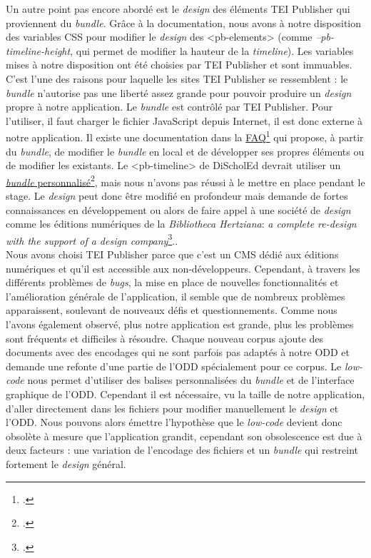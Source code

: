 Un autre point pas encore abordé est le \textit{design} des éléments TEI Publisher qui proviennent du \textit{bundle}. Grâce à la documentation, nous avons à notre disposition des variables CSS pour modifier le \textit{design} des <pb-elements> (comme \textit{--pb-timeline-height}, qui permet de modifier la hauteur de la \textit{timeline}). Les variables mises à notre disposition ont été choisies par TEI Publisher et sont immuables. C'est l'une des raisons pour laquelle les sites TEI Publisher se ressemblent : le \textit{bundle} n'autorise pas une liberté assez grande pour pouvoir produire un \textit{design} propre à notre application. Le \textit{bundle} est contrôlé par TEI Publisher. Pour l'utiliser, il faut charger le fichier JavaScript depuis Internet, il est donc externe à notre application. Il existe une documentation dans la \href{https://faq.teipublisher.com/}{FAQ\footcite{FrequentlyAskedQuestions}} qui propose, à partir du \textit{bundle}, de modifier le \textit{bundle} en local et de développer ses propres éléments ou de modifier les existants. Le <pb-timeline> de DiScholEd devrait utiliser un \href{https://gitlab.inria.fr/dh-projects/discholed/-/blob/main/Pb-component-bundle/pb-timeline.js}{\textit{bundle} personnalisé\footcite{FilesMainDHprojects2023}}, mais nous n'avons pas réussi à le mettre en place pendant le stage. Le \textit{design} peut donc être modifié en profondeur mais demande de fortes connaissances en développement ou alors de faire appel à une société de \textit{design} comme les éditions numériques de la \textit{Bibliotheca Hertziana}: \og{}\textit{a complete re-\textit{design} with the support of a \textit{design} company}\fg{}\footcite{epapers4200}..\\

Nous avons choisi TEI Publisher parce que c'est un CMS dédié aux éditions numériques et qu'il est accessible aux non-développeurs. Cependant, à travers les différents problèmes de \textit{bugs}, la mise en place de nouvelles fonctionnalités et l'amélioration générale de l'application, il semble que de nombreux problèmes apparaissent, soulevant de nouveaux défis et questionnements. Comme nous l'avons également observé, plus notre application est grande, plus les problèmes sont fréquents et difficiles à résoudre. Chaque nouveau corpus ajoute des documents avec des encodages qui ne sont parfois pas adaptés à notre ODD et demande une refonte d'une partie de l'ODD spécialement pour ce corpus. Le \textit{low-code} nous permet d'utiliser des balises personnalisées du \textit{bundle} et de l'interface graphique de l'ODD. Cependant il est nécessaire, vu la taille de notre application, d'aller directement dans les fichiers pour modifier manuellement le \textit{design} et l'ODD. Nous pouvons alors émettre l'hypothèse que le \textit{low-code} devient donc obsolète à mesure que l'application grandit, cependant son obsolescence est due à deux facteurs : une variation de l'encodage des fichiers et un \textit{bundle} qui restreint fortement le \textit{design} général. 